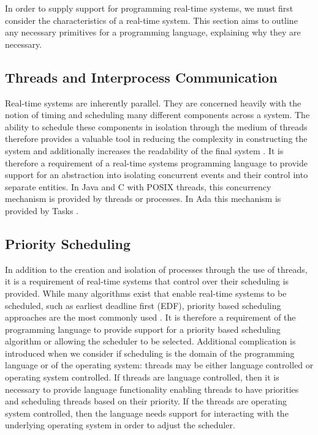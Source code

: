 In order to supply support for programming real-time systems, we must first 
consider the characteristics of a real-time system. This section aims to outline
any necessary primitives for a programming language, explaining why they are 
necessary. 

\subsection{Threads and Interprocess Communication}
Real-time systems are inherently parallel. They are concerned heavily with 
the notion of timing and scheduling many different components across a system. 
The ability to schedule these components in isolation through the medium 
of threads therefore provides a valuable tool in reducing the complexity in 
constructing the system and additionally increases the readability of the 
final system 
\cite[p132]{real-time-systems}. It is therefore a requirement of a real-time systems 
programming language to provide support for an abstraction into isolating 
concurrent events and their control into separate entities. 
In Java and 
C with POSIX threads, this concurrency mechanism is provided by threads or processes. 
In Ada this mechanism is provided by Tasks 
\cite[p251]{gehani1989concurrent}.

\subsection{Priority Scheduling}
In addition to the creation and isolation of processes through the use of 
threads, it is a requirement of real-time systems 
that control over their scheduling is provided. 
While many algorithms exist that enable real-time systems to be scheduled, such 
as earliest deadline first (EDF), priority based scheduling approaches are the 
most commonly used
\cite{real-time-systems}. 
It is therefore a requirement of the programming language to provide support 
for a priority based scheduling algorithm or allowing the scheduler to be 
selected. Additional complication is introduced when we consider if scheduling 
is the domain of the programming language or of the operating system:
threads may be either language controlled or operating system controlled. 
If threads are language controlled, then it is necessary to provide 
language functionality enabling threads to have priorities and scheduling threads 
based on their priority.
If the threads are operating system controlled, then the language needs 
support for interacting with the underlying operating system in order to 
adjust the scheduler. 

